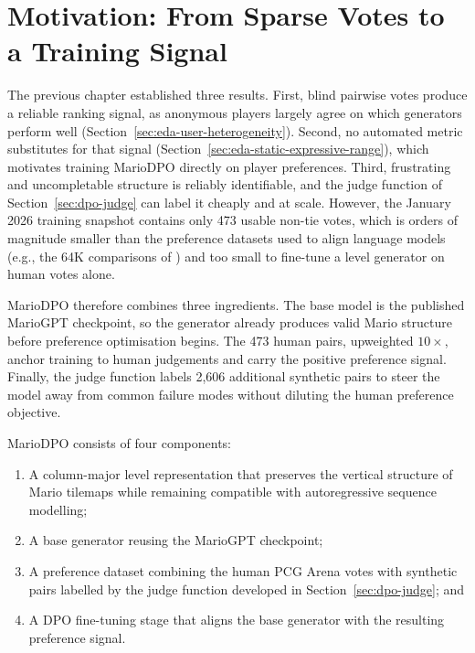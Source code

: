 \documentclass[shortabstract, mgr, english]{iithesis}
\begin{document}
\section[Motivation: From Sparse Votes to a Training Signal]{Motivation: From Sparse Votes to a Training Signal}
\label{sec:dpo-motivation}

The previous chapter established three results. First, blind pairwise
votes produce a reliable ranking signal, as anonymous players largely agree on
which generators perform well (Section~\ref{sec:eda-user-heterogeneity}). Second,
no automated metric substitutes for that signal (Section~\ref{sec:eda-static-expressive-range}), which motivates training
MarioDPO directly on player preferences. Third, frustrating and uncompletable structure is reliably
identifiable, and the judge function of Section~\ref{sec:dpo-judge} can label it
cheaply and at scale. However, the January 2026 training snapshot contains only 473 usable non-tie
votes, which is orders of magnitude smaller than the preference datasets used to align
language models (e.g., the 64K comparisons of \citet{stiennon2020learning})
and too small to fine-tune a level generator on human votes alone.

MarioDPO therefore combines three ingredients. The base model is the
published MarioGPT checkpoint, so the generator already produces valid Mario
structure before preference optimisation begins. The 473 human
pairs, upweighted $10\times$, anchor training to human
judgements and carry the positive preference signal. Finally, the judge
function labels 2,606 additional synthetic pairs to steer the model away from common failure modes without
diluting the human preference objective.

MarioDPO consists of four components:
\begin{enumerate}[nosep]
  \item A column-major level representation that preserves the vertical structure
        of Mario tilemaps while remaining compatible with autoregressive
        sequence modelling;
  \item A base generator reusing the MarioGPT checkpoint;
  \item A preference dataset combining the human PCG Arena votes with
        synthetic pairs labelled by the judge function developed in
        Section~\ref{sec:dpo-judge}; and
  \item A DPO fine-tuning stage that aligns the base generator with
        the resulting preference signal.
\end{enumerate}
\end{document}
